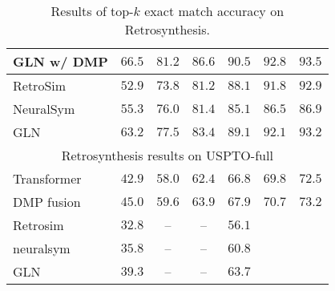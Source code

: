 \documentclass{article}
\newcommand{\ourM}{DMP}
\begin{document}
\begin{table}[!htb]
\begin{tabular}{lcccccc}
GLN w/ \ourM{}  &$66.5$&$81.2$&$86.6$&$90.5$&$92.8$&$93.5$\\
         \midrule
         RetroSim & $52.9$ &$73.8$& $81.2$&$88.1$&$91.8$&$92.9$ \\
         NeuralSym & $55.3$&$76.0$&$81.4$&$85.1$&$86.5$&$86.9$ \\
         GLN~\cite{GLN}&$63.2$&$77.5$&$83.4$&$89.1$&$92.1$&$93.2$\\
         \midrule
         \multicolumn{7}{c}{Retrosynthesis results on USPTO-full}\\
         \midrule
         Transformer & $42.9$ & $58.0$ & $62.4$ & $66.8$ &$69.8$& $72.5$ \\
\ourM{} fusion &$45.0$&$59.6$&$63.9$&$67.9$&$70.7$&$73.2$ \\
         \midrule
         Retrosim & $32.8$ & -- & -- & $56.1$ \\
         neuralsym & $35.8$ & -- & -- & $60.8$ \\
         GLN~\cite{GLN} & $39.3$ & -- & -- & $63.7$\\
         \bottomrule
    \end{tabular}
    \caption{Results of top-$k$ exact match accuracy on Retrosynthesis. }
    \label{appendix:retrosys_more}
\end{table}
\end{document}
